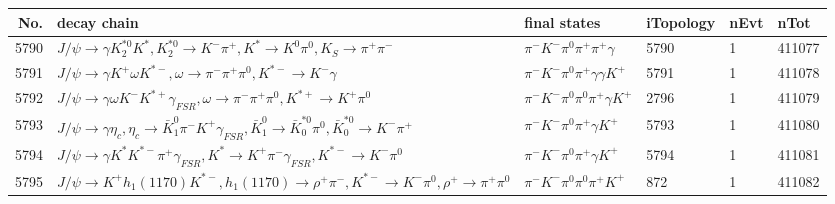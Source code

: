 \begin{table}[htbp] 
\begin{center}
\begin{small}
\begin{tabular}{rlllll}\hline\hline
 No. & decay chain & final states &  iTopology & nEvt & nTot \\\hline
5790&$J/\psi       \rightarrow \gamma       K_2^{*0}       K^{*}          , K_2^{*0}        \rightarrow K^{-}          \pi^{+}        , K^{*}           \rightarrow K^{0}          \pi^{0}        , K_{S}           \rightarrow \pi^{+}        \pi^{-}        $&$\pi^{-}        K^{-}          \pi^{0}        \pi^{+}        \pi^{+}        \gamma       $& 5790&    1&411077\\
5791&$J/\psi       \rightarrow \gamma       K^{+}          \omega         K^{*-}         , \omega          \rightarrow \pi^{-}        \pi^{+}        \pi^{0}        , K^{*-}          \rightarrow K^{-}          \gamma       $&$\pi^{-}        K^{-}          \pi^{0}        \pi^{+}        \gamma       \gamma       K^{+}          $& 5791&    1&411078\\
5792&$J/\psi       \rightarrow \gamma       \omega         K^{-}          K^{*+}         \gamma_{FSR} , \omega          \rightarrow \pi^{-}        \pi^{+}        \pi^{0}        , K^{*+}          \rightarrow K^{+}          \pi^{0}        $&$\pi^{-}        K^{-}          \pi^{0}        \pi^{0}        \pi^{+}        \gamma       K^{+}          $& 2796&    1&411079\\
5793&$J/\psi       \rightarrow \gamma       \eta_{c}    , \eta_{c}     \rightarrow \bar{K}_1^{0} \pi^{-}        K^{+}          \gamma_{FSR} , \bar{K}_1^{0}  \rightarrow \bar{K}_0^{*0}\pi^{0}        , \bar{K}_0^{*0} \rightarrow K^{-}          \pi^{+}        $&$\pi^{-}        K^{-}          \pi^{0}        \pi^{+}        \gamma       K^{+}          $& 5793&    1&411080\\
5794&$J/\psi       \rightarrow \gamma       K^{*}          K^{*-}         \pi^{+}        \gamma_{FSR} , K^{*}           \rightarrow K^{+}          \pi^{-}        \gamma_{FSR} , K^{*-}          \rightarrow K^{-}          \pi^{0}        $&$\pi^{-}        K^{-}          \pi^{0}        \pi^{+}        \gamma       K^{+}          $& 5794&    1&411081\\
5795&$J/\psi       \rightarrow K^{+}          h_{1}(1170)    K^{*-}         , h_{1}(1170)     \rightarrow \rho^{+}      \pi^{-}        , K^{*-}          \rightarrow K^{-}          \pi^{0}        , \rho^{+}       \rightarrow \pi^{+}        \pi^{0}        $&$\pi^{-}        K^{-}          \pi^{0}        \pi^{0}        \pi^{+}        K^{+}          $&  872&    1&411082\\

\end{tabular}
\end{small}
\end{center}
\end{table}
